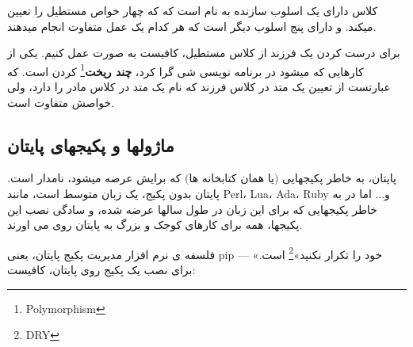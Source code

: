 \documentclass[14pt,a4paper]{memoir}
\begin{document}
	 

	 	 	 	 \begin{latin}
	 	
	 \end{latin}
	 
	 
	 کلاس  دارای یک اسلوب سازنده به نام  است که که چهار خواص مستطیل را تعیین میکند. و دارای پنج اسلوب دیگر است که هر کدام یک عمل متفاوت انجام میدهند.
	 
	  برای درست کردن یک فرزند از کلاس مستطیل، کافیست به صورت  عمل کنیم. یکی از کارهایی که میشود در برنامه نویسی شی گرا کرد، \textbf{چند ریخت}\footnote{Polymorphism} کردن است. که عبارتست از تعیین یک متد در کلاس فرزند که نام یک متد در کلاس مادر را دارد، ولی خواصش متفاوت است.
	 
	 
	 
	 \subsection{ماژولها و پکیجهای پایتان}\label{pip}
	 
	 پایتان، به خاطر پکیجهایی $ \text{(یا همان کتابخانه ها)} $ که برایش عرضه میشود، نامدار است.
	 پایتان بدون پکیج، یک زبان متوسط است، مانند Perl، Lua، Ada، Ruby و... اما در به خاطر پکیجهایی که برای این زبان در طول سالها عرضه شده، و سادگی نصب این پکیجها، همه برای کارهای کوجک و بزرگ  به پایتان روی می اورند.
	 
	 فلسفه ی نرم افزار مدیریت پکیج پایتان، یعنی pip --- «خود را تکرار نکنید»\footnote{DRY} است. برای نصب یک پکیج روی پایتان، کافیست:
	 
\end{document}
